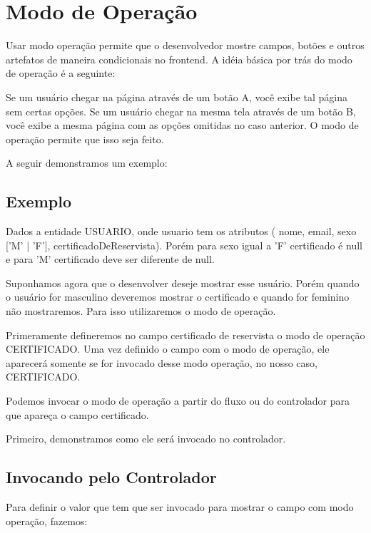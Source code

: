 \section{Modo de Operação}

Usar modo operação permite que o desenvolvedor mostre campos, botões e outros
artefatos de maneira condicionais no frontend. A idéia básica por trás do modo
de operação é a seguinte:

Se um usuário chegar na página através de um botão A, você exibe tal página sem
certas opções. Se um usuário chegar na mesma tela através de um botão B, você
exibe a mesma página com as opções omitidas no caso anterior. O modo de
operação permite que isso seja feito.

A seguir demonstramos um exemplo:

\subsection{Exemplo}

Dados a entidade USUARIO, onde usuario tem os atributos ( nome, email, sexo ['M'
| 'F'], certificadoDeReservista). Porém para sexo igual a 'F' certificado é null
e para 'M' certificado deve ser diferente de null.

Suponhamos agora que o desenvolver deseje mostrar esse usuário. Porém quando o
usuário for masculino deveremos mostrar o certificado e quando for feminino não
mostraremos. Para isso utilizaremos o modo de operação. 

Primeramente defineremos no campo certificado de reservista o modo de operação
CERTIFICADO. Uma vez definido o campo com o modo de operação, ele aparecerá
somente se for invocado desse modo operação, no nosso caso, CERTIFICADO.

Podemos invocar o modo de operação a partir do fluxo ou do controlador para que
apareça o campo certificado. 

Primeiro, demonstramos como ele será invocado no controlador.

\subsection{Invocando pelo Controlador} 

Para definir o valor que tem que ser invocado para mostrar o campo com modo
operação, fazemos:
 
